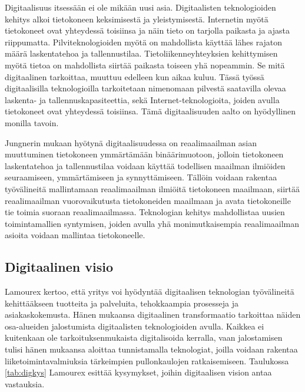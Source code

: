 \documentclass[finnish,12pt,a4paper,pdftex]{article}
\begin{document}
Digitaalisuus itsessään ei ole mikään uusi asia. Digitaalisten teknologioiden kehitys alkoi tietokoneen keksimisestä ja yleistymisestä. Internetin myötä tietokoneet ovat yhteydessä toisiinsa ja näin tieto on tarjolla paikasta ja ajasta riippumatta. Pilviteknologioiden myötä on mahdollista käyttää lähes rajaton määrä laskentatehoa ja tallennustilaa. Tietoliikenneyhteyksien kehittymisen myötä tietoa on mahdollista siirtää paikasta toiseen yhä nopeammin. Se mitä digitaalinen tarkoittaa, muuttuu edelleen kun aikaa kuluu. Tässä työssä digitaalisilla teknologioilla tarkoitetaan nimenomaan pilvestä saatavilla olevaa laskenta- ja tallennuskapasiteettia, sekä Internet-teknologioita, joiden avulla tietokoneet ovat yhteydessä toisiinsa. Tämä digitaalisuuden aalto on hyödyllinen monilla tavoin. 

Jungnerin \citeyearpar{jungner} mukaan hyötynä digitaalisuudessa on reaalimaailman asian muuttuminen tietokoneen ymmärtämään binäärimuotoon, jolloin tietokoneen laskentatehoa ja tallennustilaa voidaan käyttää todellisen maailman ilmiöiden seuraamiseen, ymmärtämiseen ja synnyttämiseen. Tällöin voidaan rakentaa työvälineitä mallintamaan reaalimaailman ilmiöitä tietokoneen maailmaan, siirtää reaalimaailman vuorovaikutusta tietokoneiden maailmaan ja avata tietokoneille tie toimia suoraan reaalimaailmassa. Teknologian kehitys mahdollistaa uusien toimintamallien syntymisen, joiden avulla yhä monimutkaisempia reaalimaailman asioita voidaan mallintaa tietokoneelle.

\subsection{Digitaalinen visio}

Lamourex \citeyearpar{lamoureux} kertoo, että yritys voi hyödyntää digitaalisen teknologian työvälineitä kehittääkseen tuotteita ja palveluita, tehokkaampia prosesseja ja asiakaskokemusta. Hänen mukaansa digitaalinen transformaatio tarkoittaa näiden osa-alueiden jalostumista digitaalisten teknologioiden avulla. Kaikkea ei kuitenkaan ole tarkoituksenmukaista digitalisoida kerralla, vaan jalostamisen tulisi hänen mukaansa aloittaa tunnistamalla teknologiat, joilla voidaan rakentaa liiketoimintavalmiuksia tärkeimpien pullonkaulojen ratkaisemiseen. Taulukossa \ref{tab:digkys} Lamourex esittää kysymykset, joihin digitaalisen vision antaa vastauksia.
\end{document}
